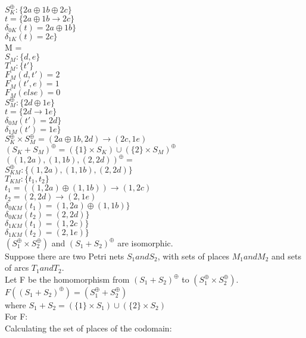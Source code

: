 %
$S_K^\oplus :\{ 2a \oplus 1b \oplus 2c\}$\\
$t = \{ 2a \oplus 1b \to 2c \}$\\  
$\delta_{0K} (t) = 2a \oplus 1b \}$\\
$\delta_{1K} (t) = 2c \}$\\
\smallskip
M = \\
$S_M :\{d,e\}$\\
$T_M :\{t'\}$\\  
$F_M (d, t') = 2$\\
$F_M (t', e) = 1$\\
$F_M (else) = 0$\\
%
$S_M^\oplus :\{ 2d \oplus 1e\}$\\
$t = \{ 2d \to 1e \}$\\  
$\delta_{0M} (t') = 2d \}$\\
$\delta_{1M} (t') = 1e \}$\\
\smallskip
$S_K^\oplus \times S_M^\oplus = (2a \oplus 1b, 2d) \to (2c, 1e)$\\
\smallskip
$(S_K + S_M)^\oplus = (\{1\} \times S_K) \cup (\{2\} \times S_M)^\oplus$\\
$((1, 2a), (1, 1b), (2, 2d))^\oplus = $\\
$S_{KM}^\oplus: \{(1, 2a), (1, 1b), (2, 2d) \}$\\
$T_{KM}: \{t_1, t_2\}$\\
$t_1 = ((1, 2a) \oplus (1, 1b)) \to (1, 2c)$\\
$t_2 = (2, 2d) \to (2, 1e)$\\
$\delta_{0KM} (t_1) = (1, 2a) \oplus (1, 1b) \}$\\
$\delta_{0KM} (t_2) = (2, 2d) \}$\\
$\delta_{1KM} (t_1) = (1, 2c) \}$\\
$\delta_{1KM} (t_2) = (2, 1e) \}$\\
\smallskip
$(S_1 ^\oplus \times S_2 ^\oplus)$ and $(S_1 + S_2)^\oplus$ are isomorphic. \\
Suppose there are two Petri nets $S_1 and S_2$, with sets of places $M_1 and M_2$ and sets of arcs $T_1 and T_2.$\\
Let F be the homomorphism from $(S_1 + S_2)^\oplus$ to $(S_1 ^\oplus \times S_2 ^\oplus)$. \\
$F((S_1 + S_2)^\oplus) = (S_1 ^\oplus + S_2 ^\oplus)$\\
where $S_1 + S_2 = (\{1\} \times S_1) \cup (\{2\} \times S_2)$\\
For F:\\
Calculating the set of places of the codomain:\\
